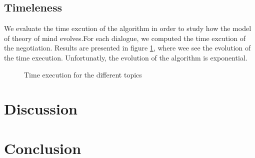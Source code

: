 \documentclass[sigconf]{aamas}  %
\begin{document}
	\subsection{Timeleness}
	We evaluate the time excution of the algorithm in order to study how the model of theory of mind evolves.For each dialogue, we computed the time excution of the negotiation. Results are presented in figure \ref{fig:time}, where wee see the evolution of the time execution. Unfortunatly, the evolution of the algorithm is exponential.
	\begin{figure}
		\caption{Time execution for the different topics}\label{fig:time}
	\end{figure}
%	
	\section{Discussion}
	\section{Conclusion}
	
	
\end{document}
